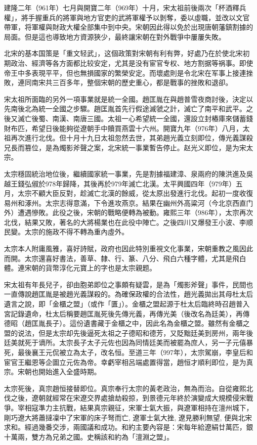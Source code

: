 建隆二年（961年）七月與開寶二年（969年）十月，宋太祖前後兩次「杯酒釋兵權」，將手握重兵的將軍與地方官吏的武將軍權予以剝奪，委以虛職，並改以文官帶軍，将軍權與財政大權全部集中到中央。宋朝因此得以免於出現唐朝藩鎮割據的局面。但是這也導致地方資源狹少，最終讓宋朝在對外戰爭中屢屢失敗。

北宋的基本国策是「重文轻武」，这個政策對宋朝有利有弊，好處乃在於使北宋初期政治、經濟等各方面都比较安定，尤其是没有宦官专权、地方割据等祸事。即使帝王中多表現平平，但也無損國家的繁榮安定。而壞處則是令北宋在军事上接連挫敗，連同南宋共三百多年，整個宋朝的歷史重心，都是戰事的挫敗和退卻。

宋太祖所面臨的另外一項事業就是統一全國。趙匡胤在與趙普雪夜商討後，決定以先南後北為統一全國之步驟。趙匡胤首先行假途滅虢之計，滅亡了南平和武平。之後又滅亡後蜀、南漢、南唐三國。太祖一心希望統一全國，還設立封樁庫來儲蓄錢財布匹，希望日後能夠從遼朝手中贖買燕雲十六州。開寶九年（976年）八月，太祖再次進行北伐。但十月十九日太祖忽然去世，其弟趙光義立刻即位，傳光義謀殺兄長而篡位，是為燭影斧聲之案，北宋統一事業暫告停止。赵光义即位，是为宋太宗。

太宗穩固統治地位後，繼續國家統一事業，先是割據福建漳、泉兩府的陳洪進及吳越王錢弘俶於978年歸降，其後再於979年滅亡北漢。太平興國四年（979年）五月，太宗不顧大臣反對，趁滅亡北漢的餘威，從太原出發進行北伐。起初一度收復易州和涿州。太宗志得意滿，下令進攻燕京。結果在幽州外高粱河（今北京西直门外）遭遇慘敗。此役之後，宋朝的戰略便轉為被動。雍熙三年（986年），太宗再次北伐，結果又敗，著名的大將楊業也在此役中陣亡。之後四川又爆發王小波、李顺民變。太宗的施政不得不轉為重內虛外。

太宗本人附庸風雅，喜好詩賦，政府也因此特別重視文化事業，宋朝重教之風因此而開。太宗還喜好書法，善草、隸、行、篆、八分、飛白六種字體，尤其是飛白體。連宋朝的貨幣淳化元寶上的字也是太宗親题。

宋太祖有年長兒子，卻由胞弟即位之事頗有疑雲，是為「燭影斧聲」事件，民間也一直傳說趙匡胤是被趙光義謀殺的。為確保政權的合法性，趙光義拋出其母杜太后遺言之說，即「金櫃之盟」（或作「匱」）。金櫃之盟起源于杜太后臨終時召趙普入宮記錄遺命，杜太后稱要趙匡胤死後先傳光義，再傳光美（後改名為廷美），再傳德昭（趙匡胤長子）。這份遺書藏于金櫃之中，因此名為金櫃之盟。雖然有金櫃之盟的说法，但是太宗却先後逼死太祖之子德昭和德芳，又貶黜廷美到房州，兩年後廷美就死于谪所。太宗長子太子元佐也因為同情廷美而被罷為庶人，另一子元僖暴死，最後襄王元侃被立為太子，改名恒。至道三年（997年），太宗駕崩，李皇后和宦官王繼恩等企圖立元佐為帝。幸虧宰相呂端處置得當，趙恒才順利即位，是为真宗。宋朝也開始進入全盛時期。

太宗死後，真宗趙恒接替即位。真宗奉行太宗的黃老政治，無為而治。自從雍熙北伐之後，遼朝就經常在宋遼交界處搶劫殺掠，到景德元年終於演變成大規模侵宋戰爭。宰相寇準力主抗戰，結果真宗親征，宋軍士氣大振，與遼軍相持在澶州城下，剛巧遼大將蕭撻凜中了宋軍的床子弩而亡, 遼軍士氣大挫, 遼見勝利無望, 便與北宋求和。經過幾番交涉，兩國議和成功。和約主要內容是：宋每年給遼絹廿萬匹，銀十萬兩，雙方為兄弟之國。史稱該和約為「澶淵之盟」。

